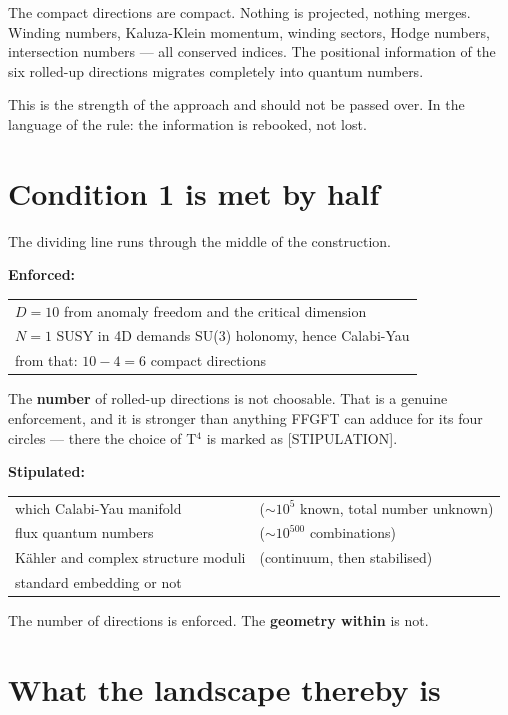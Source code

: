 The compact directions are compact. Nothing is projected, nothing
merges. Winding numbers, Kaluza-Klein momentum, winding sectors, Hodge
numbers, intersection numbers --- all conserved indices. The positional
information of the six rolled-up directions migrates completely into
quantum numbers.

This is the strength of the approach and should not be passed over. In
the language of the rule: the information is rebooked, not lost.

\section{Condition 1 is met by half}

The dividing line runs through the middle of the construction.

\textbf{Enforced:}
\begin{center}
\begin{tabular}{l}
$D = 10$ from anomaly freedom and the critical dimension \\
$N = 1$ SUSY in 4D demands SU(3) holonomy, hence Calabi-Yau \\
from that: $10 - 4 = 6$ compact directions \\
\end{tabular}
\end{center}

The \textbf{number} of rolled-up directions is not choosable. That is a
genuine enforcement, and it is stronger than anything FFGFT can adduce
for its four circles --- there the choice of T$^4$ is marked as
[STIPULATION].

\textbf{Stipulated:}
\begin{center}
\begin{tabular}{ll}
which Calabi-Yau manifold & ($\sim 10^5$ known, total number unknown) \\
flux quantum numbers & ($\sim 10^{500}$ combinations) \\
K\"ahler and complex structure moduli & (continuum, then stabilised) \\
standard embedding or not & \\
\end{tabular}
\end{center}

The number of directions is enforced. The \textbf{geometry within} is
not.

\section{What the landscape thereby is}

